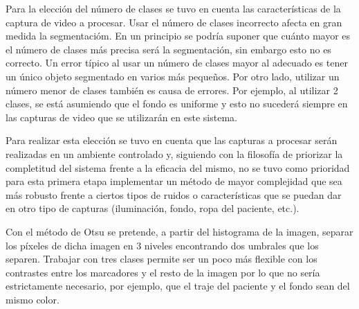Para la elección del número de clases se tuvo en cuenta las características de la captura de video a procesar. Usar el número de clases incorrecto afecta en gran medida la segmentacióm. En un principio se podría suponer que cuánto mayor es el número de clases más precisa será la segmentación, sin embargo esto no es correcto. Un error típico al usar un número de clases mayor al adecuado es tener un único objeto segmentado en varios más pequeños. Por otro lado, utilizar un número menor de clases también es causa de errores. Por ejemplo, al utilizar 2 clases, se está asumiendo que el fondo es uniforme y esto no sucederá siempre en las capturas de video que se utilizarán en este sistema.

Para realizar esta elección se tuvo en cuenta que las capturas a procesar serán realizadas en un ambiente controlado y, siguiendo con la filosofía de priorizar la completitud del sistema frente a la eficacia del mismo, no se tuvo como prioridad para esta primera etapa implementar un método de mayor complejidad que sea más robusto frente a ciertos tipos de ruidos o características que se puedan dar en otro tipo de capturas (iluminación, fondo, ropa del paciente, etc.). 

Con el método de Otsu \cite{otsu} se pretende, a partir del histograma de la imagen, separar los píxeles de dicha imagen en 3 niveles encontrando dos umbrales que los separen. Trabajar con tres clases permite ser un poco más flexible con los contrastes entre los marcadores y el resto de la imagen por lo que no sería estrictamente necesario, por ejemplo, que el traje del paciente y el fondo sean del mismo color.

